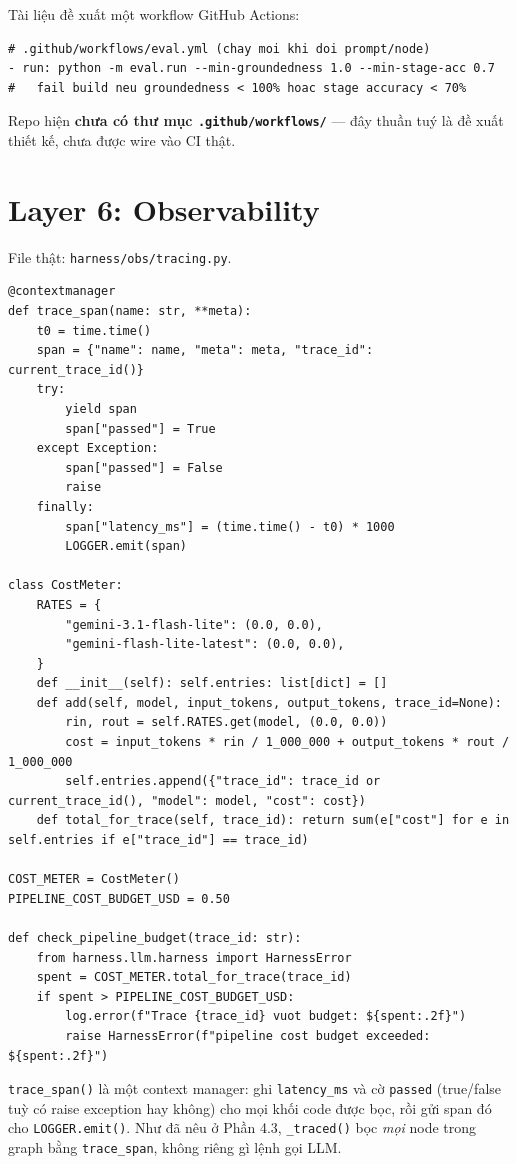 \documentclass[12pt,a4paper]{article}
\newcommand{\file}[1]{\texttt{#1}}
\begin{document}
Tài liệu đề xuất một workflow GitHub Actions:
\begin{lstlisting}
# .github/workflows/eval.yml (chay moi khi doi prompt/node)
- run: python -m eval.run --min-groundedness 1.0 --min-stage-acc 0.7
#   fail build neu groundedness < 100% hoac stage accuracy < 70%
\end{lstlisting}
Repo hiện \textbf{chưa có thư mục \file{.github/workflows/}} --- đây thuần tuý là đề xuất thiết
kế, chưa được wire vào CI thật.

\section{Layer 6: Observability}

File thật: \file{harness/obs/tracing.py}.

\begin{lstlisting}
@contextmanager
def trace_span(name: str, **meta):
    t0 = time.time()
    span = {"name": name, "meta": meta, "trace_id": current_trace_id()}
    try:
        yield span
        span["passed"] = True
    except Exception:
        span["passed"] = False
        raise
    finally:
        span["latency_ms"] = (time.time() - t0) * 1000
        LOGGER.emit(span)

class CostMeter:
    RATES = {
        "gemini-3.1-flash-lite": (0.0, 0.0),
        "gemini-flash-lite-latest": (0.0, 0.0),
    }
    def __init__(self): self.entries: list[dict] = []
    def add(self, model, input_tokens, output_tokens, trace_id=None):
        rin, rout = self.RATES.get(model, (0.0, 0.0))
        cost = input_tokens * rin / 1_000_000 + output_tokens * rout / 1_000_000
        self.entries.append({"trace_id": trace_id or current_trace_id(), "model": model, "cost": cost})
    def total_for_trace(self, trace_id): return sum(e["cost"] for e in self.entries if e["trace_id"] == trace_id)

COST_METER = CostMeter()
PIPELINE_COST_BUDGET_USD = 0.50

def check_pipeline_budget(trace_id: str):
    from harness.llm.harness import HarnessError
    spent = COST_METER.total_for_trace(trace_id)
    if spent > PIPELINE_COST_BUDGET_USD:
        log.error(f"Trace {trace_id} vuot budget: ${spent:.2f}")
        raise HarnessError(f"pipeline cost budget exceeded: ${spent:.2f}")
\end{lstlisting}

\texttt{trace\_span()} là một context manager: ghi \texttt{latency\_ms} và cờ \texttt{passed}
(true/false tuỳ có raise exception hay không) cho mọi khối code được bọc, rồi gửi span đó cho
\texttt{LOGGER.emit()}. Như đã nêu ở Phần 4.3, \texttt{\_traced()} bọc \emph{mọi} node trong graph
bằng \texttt{trace\_span}, không riêng gì lệnh gọi LLM.
\end{document}
